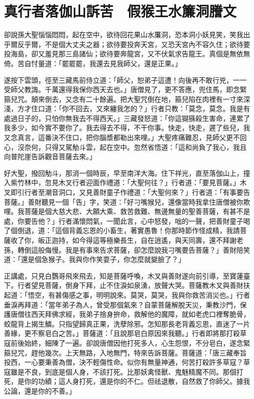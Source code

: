 
\chapter{真行者落伽山訴苦　假猴王水簾洞謄文}

卻說孫大聖惱惱悶悶，起在空中，欲待回花果山水簾洞，恐本洞小妖見笑，笑我出乎爾反乎爾，不是個大丈夫之器；欲待要投奔天宮，又恐天宮內不容久住；欲待要投海島，卻又羞見那三島諸仙；欲待要奔龍宮，又不伏氣求告龍王。真個是無依無倚。苦自忖量道：「罷罷罷，我還去見我師父，還是正果。」

遂按下雲頭，徑至三藏馬前侍立道：「師父，恕弟子這遭！向後再不敢行兇，一一受師父教誨。千萬還得我保你西天去也。」唐僧見了，更不答應，兜住馬，即念緊箍兒咒。顛來倒去，又念有二十餘遍。把大聖咒倒在地，箍兒陷在肉裡有一寸來深淺，方才住口道：「你不回去，又來纏我怎的？」行者只教：「莫念，莫念。我是有處過日子的，只怕你無我去不得西天。」三藏發怒道：「你這猢猻殺生害命，連累了我多少，如今實不要你了。我去得去不得，不干你事。快走，快走，遲了些兒，我又念真言，這番決不住口，把你腦漿都勒出來哩。」大聖疼痛難忍，見師父更不回心，沒奈何，只得又駕觔斗雲，起在空中。忽然省悟道：「這和尚負了我心，我且向普陀崖告訴觀音菩薩去來。」

好大聖，撥回觔斗，那消一個時辰，早至南洋大海。住下祥光，直至落伽山上，撞入紫竹林中，忽見木叉行者迎面作禮道：「大聖何往？」行者道：「要見菩薩。」木叉即引行者至潮音洞口，又見善財童子作禮道：「大聖何來？」行者道：「有事要告菩薩。」善財聽見一個「告」字，笑道：「好刁嘴猴兒，還像當時我拿住唐僧被你欺哩。我菩薩是個大慈大悲、大願大乘、救苦救難、無邊無量的聖善菩薩，有甚不是處，你要告他？」行者滿懷悶氣，一聞此言，心中怒發，咄的一聲，把善財童子喝了個倒退，道：「這個背義忘恩的小畜生，著實愚魯！你那時節作怪成精，我請菩薩收了你，皈正迦持，如今得這等極樂長生，自在逍遙，與天同壽，還不拜謝老孫，轉倒這般侮慢。我是有事來告求菩薩，卻怎麼說我刁嘴要告菩薩？」善財陪笑道：「還是個急猴子。我與你作笑耍子，你怎麼就變臉了？」

正講處，只見白鸚哥飛來飛去，知是菩薩呼喚，木叉與善財遂向前引導，至寶蓮臺下。行者望見菩薩，倒身下拜，止不住淚如泉湧，放聲大哭。菩薩教木叉與善財扶起道：「悟空，有甚傷感之事，明明說來。莫哭，莫哭，我與你救苦消災也。」行者垂淚再拜道：「當年弟子為人，曾受那個氣來？自蒙菩薩解脫天災，秉教沙門，保護唐僧往西天拜佛求經，我弟子捨身拚命，救解他的魔障，就如老虎口裡奪脆骨，蛟龍背上揭生鱗。只指望歸真正果，洗孽除邪。怎知那長老背義忘恩，直迷了一片善緣，更不察皂白之苦。」菩薩道：「且說那皂白原因來我聽。」行者即將那打殺草寇前後始終，細陳了一遍。卻說唐僧因他打死多人，心生怨恨，不分皂白，遂念緊箍兒咒，趕他幾次。上天無路，入地無門，特來告訴菩薩。菩薩道：「唐三藏奉旨投西，一心要秉善為僧，決不輕傷性命。似你有無量神通，何苦打殺許多草寇？草寇雖是不良，到底是個人身，不該打死。比那妖禽怪獸、鬼魅精魔不同。那個打死，是你的功績；這人身打死，還是你的不仁。但祛退散，自然救了你師父。據我公論，還是你的不善。」

